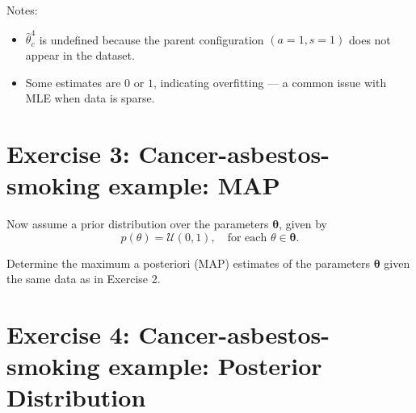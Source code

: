 \documentclass[11pt]{article}
\newif\ifshowanswers
\begin{document}
Notes:
\begin{itemize}
  \item $\hat{\theta}_c^4$ is undefined because the parent configuration $(a=1, s=1)$ does not appear in the dataset.
  \item Some estimates are $0$ or $1$, indicating overfitting — a common issue with MLE when data is sparse.
\end{itemize}

\fi

\section*{Exercise 3: Cancer-asbestos-smoking example: MAP}

Now assume a prior distribution over the parameters $\bm{\theta}$, given by
\[
  p(\theta) = \mathcal{U}(0, 1), \quad \text{for each } \theta \in \bm{\theta}.
\]

\noindent
Determine the maximum a posteriori (MAP) estimates of the parameters $\bm{\theta}$ given the same data as in Exercise 2.
\ifshowanswers
  \paragraph{Solution.}
  The MAP estimate maximises the posterior distribution:
  \[
    \hat{\bm{\theta}}_{\text{MAP}} = \arg\max_{\bm{\theta}} p(\bm{\theta} \mid \mathcal{D}) = \arg\max_{\bm{\theta}} p(\mathcal{D} \mid \bm{\theta}) p(\bm{\theta}).
  \]
  Since the prior is uniform, it does not affect the maximisation, and we can focus on the likelihood:
  \[
    \hat{\bm{\theta}}_{\text{MAP}} = \arg\max_{\bm{\theta}} p(\mathcal{D} \mid \bm{\theta}).
  \]
  The MLEs from Exercise 2 are also the MAP estimates in this case, as the uniform prior does not change the maximisation:
  \begin{align*}
    \hat{\theta}_a &= \frac{1}{5}, \\
    \hat{\theta}_s &= \frac{2}{5}, \\
    \hat{\theta}_c^1 &= 0, \\
    \hat{\theta}_c^2 &= 1, \\
    \hat{\theta}_c^3 &= 0.5, \\
    \hat{\theta}_c^4 &\text{ undefined}.
  \end{align*}
\fi

\section*{Exercise 4: Cancer-asbestos-smoking example: Posterior Distribution}
\end{document}
